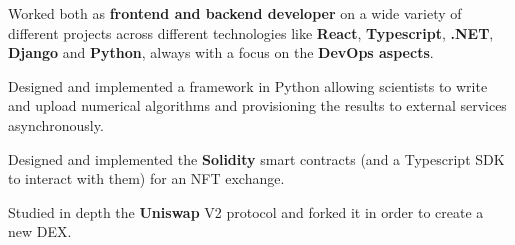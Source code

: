 \documentclass[]{cv}
\begin{document}
\begin{minipage}[t]{0.75\textwidth}
  \begin{tightemize}
  \item Worked both as \textbf{frontend and backend developer} on a
    wide variety of different projects across different technologies
    like \textbf{React}, \textbf{Typescript}, \textbf{.NET},
    \textbf{Django} and \textbf{Python}, always with a focus on the
    \textbf{DevOps aspects}.
  \item Designed and implemented a framework in Python allowing
    scientists to write and upload numerical algorithms and
    provisioning the results to external services asynchronously.
  \item Designed and implemented the \textbf{Solidity} smart
    contracts (and a Typescript SDK to interact with them) for an NFT exchange.
  \item Studied in depth the \textbf{Uniswap} V2 protocol and forked
    it in order to create a new DEX.
  \end{tightemize}
  \sectionsep



\end{minipage}
\end{document}
